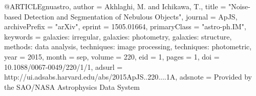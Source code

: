 
@ARTICLE{gnuastro,
   author = {{Akhlaghi}, M. and {Ichikawa}, T.},
    title = "{Noise-based Detection and Segmentation of Nebulous Objects}",
  journal = {ApJS},
archivePrefix = "arXiv",
   eprint = {1505.01664},
 primaryClass = "astro-ph.IM",
 keywords = {galaxies: irregular, galaxies: photometry, galaxies: structure, methods: data analysis, techniques: image processing, techniques: photometric},
     year = 2015,
    month = sep,
   volume = 220,
      eid = {1},
    pages = {1},
      doi = {10.1088/0067-0049/220/1/1},
   adsurl = {http://ui.adsabs.harvard.edu/abs/2015ApJS..220....1A},
  adsnote = {Provided by the SAO/NASA Astrophysics Data System}
}
